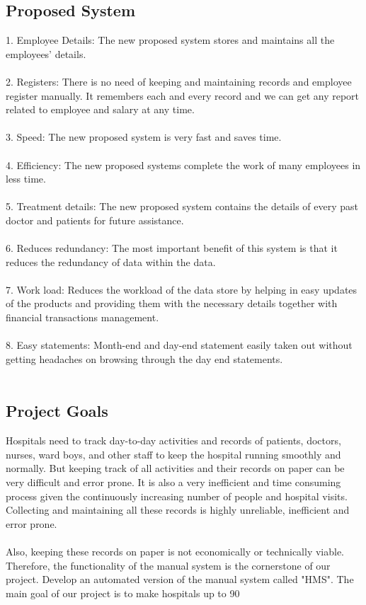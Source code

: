 \documentclass{article}
\begin{document}
\subsection{Proposed System}
1.	Employee Details: The new proposed system stores and maintains all the employees’ details.
\\\\
2.	Registers: There is no need of keeping and maintaining records and employee register manually. It remembers each and every record and we can get any report related to employee and salary at any time.\\\\
3.	Speed: The new proposed system is very fast and saves time.
\\\\
4.	Efficiency: The new proposed systems complete the work of many employees in less time.
\\\\
5.	Treatment details: The new proposed system contains the details of every past doctor and patients for future assistance.
\\\\
6.	Reduces redundancy: The most important benefit of this system is that it reduces the redundancy of data within the data.
\\\\
7.	Work load: Reduces the workload of the data store by helping in easy updates of the products and providing them with the necessary details together with financial transactions management.
\\\\
8.	Easy statements: Month-end and day-end statement easily taken out without getting headaches on browsing through the day end statements.
\\\\
\newpage
\subsection{Project Goals}
Hospitals need to track day-to-day activities and records of patients, doctors, nurses, ward boys, and other staff to keep the hospital running smoothly and normally. But keeping track of all activities and their records on paper can be very difficult and error prone. It is also a very inefficient and time consuming process given the continuously increasing number of people and hospital visits. Collecting and maintaining all these records is highly unreliable, inefficient and error prone.\\\\
Also, keeping these records on paper is not economically or technically viable. Therefore, the functionality of the manual system is the cornerstone of our project. Develop an automated version of the manual system called "HMS". The main goal of our project is to make hospitals up to 90%
\newpage
\end{document}
